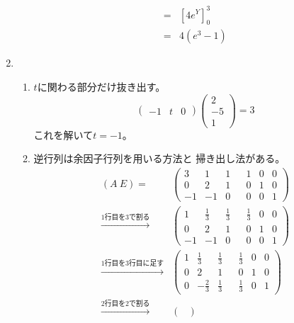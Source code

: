 \documentclass[12pt,b5paper]{ltjsarticle}
\begin{document}
\begin{enumerate}
\begin{enumerate}
\begin{align}
             =& \left[ 4e^{Y} \right]_{0}^{3}\\
             =& 4(e^3-1)
            \end{align}
      \end{enumerate}
 \item
      \begin{enumerate}
       \item
            $t$に関わる部分だけ抜き出す。
            \begin{equation}
             \begin{pmatrix}-1&t&0\end{pmatrix}
             \begin{pmatrix}2\\-5\\1\end{pmatrix}
             =3
            \end{equation}
            これを解いて$t=-1$。
       \item
            逆行列は余因子行列を用いる方法と
            掃き出し法がある。
            \begin{align}
            (A \ E) =& \begin{pmatrix}
                       3&1&1& & 1&0&0\\
                       0& 2& 1& & 0& 1& 0\\
                       -1& -1& 0& & 0& 0& 1
                      \end{pmatrix}\\
             \stackrel{\text{1行目を3で割る}}{\longrightarrow}&
             \begin{pmatrix}
              1 & \frac{1}{3} & \frac{1}{3} & & \frac{1}{3} & 0 & 0\\
              0& 2& 1& & 0& 1& 0\\
              -1& -1& 0& & 0& 0& 1
             \end{pmatrix}\\
             \stackrel{\text{1行目を3行目に足す}}{\longrightarrow}&
             \begin{pmatrix}
              1 & \frac{1}{3} & \frac{1}{3} & & \frac{1}{3} & 0 & 0\\
              0& 2& 1& & 0& 1& 0\\
              0& -\frac{2}{3}& \frac{1}{3}& & \frac{1}{3}& 0& 1
             \end{pmatrix}\\
             \stackrel{\text{2行目を2で割る}}{\longrightarrow}&
             \begin{pmatrix}

\end{pmatrix}
\end{align}
\end{enumerate}
\end{enumerate}
\end{document}
